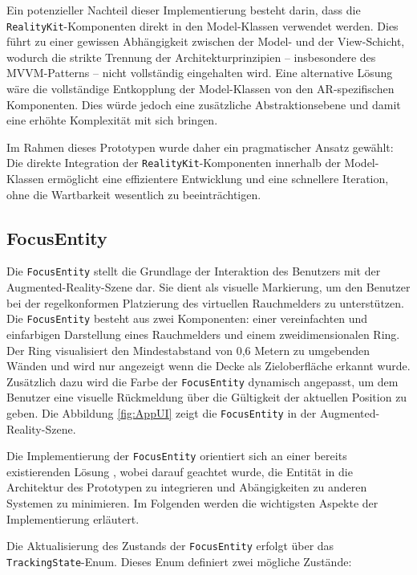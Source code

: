 Ein potenzieller Nachteil dieser Implementierung besteht darin, dass die \texttt{RealityKit}-Komponenten direkt in den Model-Klassen verwendet werden. Dies führt zu einer gewissen Abhängigkeit zwischen der Model- und der View-Schicht, wodurch die strikte Trennung der Architekturprinzipien – insbesondere des MVVM-Patterns – nicht vollständig eingehalten wird. Eine alternative Lösung wäre die vollständige Entkopplung der Model-Klassen von den AR-spezifischen Komponenten. Dies würde jedoch eine zusätzliche Abstraktionsebene und damit eine erhöhte Komplexität mit sich bringen.

Im Rahmen dieses Prototypen wurde daher ein pragmatischer Ansatz gewählt: Die direkte Integration der \texttt{RealityKit}-Komponenten innerhalb der Model-Klassen ermöglicht eine effizientere Entwicklung und eine schnellere Iteration, ohne die Wartbarkeit wesentlich zu beeinträchtigen.

\subsection{FocusEntity}

Die \texttt{FocusEntity} stellt die Grundlage der Interaktion des Benutzers mit der Augmented-Reality-Szene dar. Sie dient als visuelle Markierung, um den Benutzer bei der regelkonformen Platzierung des virtuellen Rauchmelders zu unterstützen. Die \texttt{FocusEntity} besteht aus zwei Komponenten: einer vereinfachten und einfarbigen Darstellung eines Rauchmelders und einem zweidimensionalen Ring. Der Ring visualisiert den Mindestabstand von 0,6 Metern zu umgebenden Wänden und wird nur angezeigt wenn die Decke als Zieloberfläche erkannt wurde. Zusätzlich dazu wird die Farbe der \texttt{FocusEntity} dynamisch angepasst, um dem Benutzer eine visuelle Rückmeldung über die Gültigkeit der aktuellen Position zu geben. Die Abbildung \ref{fig:AppUI} zeigt die \texttt{FocusEntity} in der Augmented-Reality-Szene.

Die Implementierung der \texttt{FocusEntity} orientiert sich an einer bereits existierenden Lösung \cite{cobb2019focusEntity}, wobei darauf geachtet wurde, die Entität in die Architektur des Prototypen zu integrieren und Abängigkeiten zu anderen Systemen zu minimieren. Im Folgenden werden die wichtigsten Aspekte der Implementierung erläutert.

Die Aktualisierung des Zustands der \texttt{FocusEntity} erfolgt über das \texttt{TrackingState}-Enum. Dieses Enum definiert zwei mögliche Zustände:


